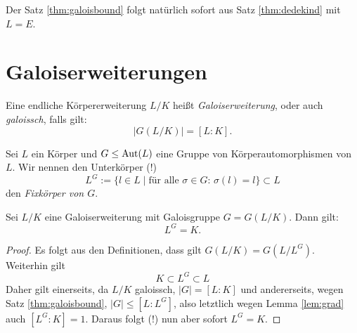 \documentclass{book}
\begin{document}
Der Satz \ref{thm:galoisbound} folgt natürlich sofort aus Satz \ref{thm:dedekind} mit $L = E$. 

\section{Galoiserweiterungen}%
\label{sec:galoiserweiterungen}

\begin{defi}
    \label{defi:galois}
    Eine endliche Körpererweiterung $L/K$ heißt \emph{Galoiserweiterung}, oder
    auch \emph{galoissch}, falls gilt:
    \[
        |G(L/K)| = [L:K].
    \]
\end{defi}

Sei $L$ ein Körper und $G \le \operatorname{Aut}(L)$ eine Gruppe von Körperautomorphismen von $L$. Wir nennen den Unterkörper (!)
\[
    L^G := \{ l \in L \; |\; \text{für alle $\sigma \in G$: $\sigma(l) = l$} \} \subset L
\]
den \emph{Fixkörper von $G$}.

\begin{thm}
    \label{thm:fix}
    Sei $L/K$ eine Galoiserweiterung mit Galoisgruppe $G = G(L/K)$. Dann gilt:
    \[
        L^G = K.
    \]
\end{thm}
\begin{proof}
    Es folgt aus den Definitionen, dass gilt $G(L/K) = G(L/L^G)$. Weiterhin gilt
    \[
        K \subset L^G \subset L
    \]
    Daher gilt einerseits, da $L/K$ galoissch, $|G| = [L:K]$ und andererseits,
    wegen Satz \ref{thm:galoisbound}, $|G| \le [L:L^G]$, also letztlich wegen
    Lemma \ref{lem:grad} auch $[L^G:K] = 1$. Daraus folgt (!) nun aber sofort
    $L^G = K$. 
\end{proof}
\end{document}
